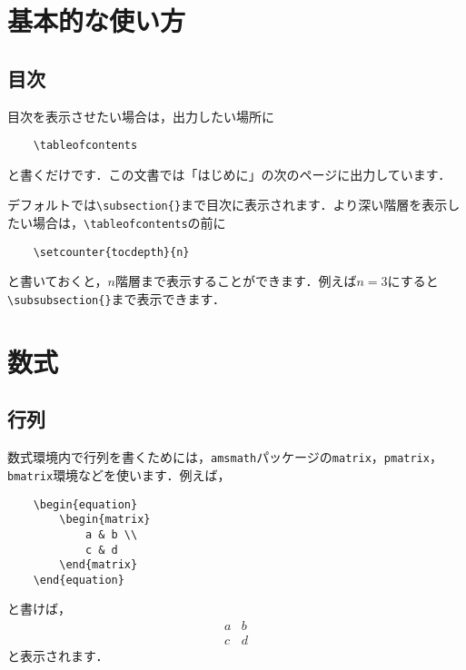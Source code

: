 \documentclass[a4paper,11pt]{ltjsreport}
\numberwithin{equation}{section}
\theoremstyle{definition}
\begin{document}
\chapter{基本的な使い方}


\section{目次}

目次を表示させたい場合は，出力したい場所に
\begin{verbatim}
    \tableofcontents
\end{verbatim}
と書くだけです．この文書では「はじめに」の次のページに出力しています．

デフォルトでは\verb|\subsection{}|まで目次に表示されます．より深い階層を表示したい場合は，\verb|\tableofcontents|の前に
\begin{verbatim}
    \setcounter{tocdepth}{n}
\end{verbatim}
と書いておくと，$n$階層まで表示することができます．例えば$n=3$にすると\verb|\subsubsection{}|まで表示できます．



\chapter{数式}


\section{行列}

数式環境内で行列を書くためには，\verb|amsmath|パッケージの\verb|matrix|，\verb|pmatrix|，\verb|bmatrix|環境などを使います．例えば，
\begin{verbatim}
    \begin{equation}
        \begin{matrix}
            a & b \\
            c & d
        \end{matrix}
    \end{equation}
\end{verbatim}
と書けば，
\begin{equation}
    \begin{matrix}
        a & b \\
        c & d
    \end{matrix}
\end{equation}
と表示されます．
\end{document}

